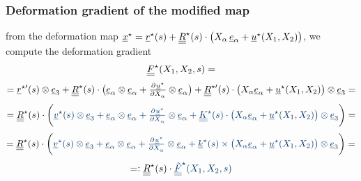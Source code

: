 \begin{frame}
  \frametitle{Deformation gradient of the modified map}

  from the deformation map $\underline{x}^{\star} = \underline{r}^{\star}(s) + \underline{\underline{R}}^{\star}(s) \cdot \bigl( X_{\alpha} \, \underline{e}_{\alpha} + \underline{u}^{\star}(X_1,X_2) \bigr)$, \newline
  we compute the deformation gradient
  \vspace{0.3em}
  \begin{displaymath}
    \underline{\underline{F}}^{\star}(X_1,X_2,s) =
  \end{displaymath}
  \begin{displaymath}
    = \underline{r}^{\star \prime}(s) \otimes \underline{e}_3 +
      \doubleunderline{R}^{\star}(s) \cdot \bigl( \underline{e}_{\alpha} \otimes \underline{e}_{\alpha} +
      \pd{\underline{u}^{\star}}{X_{\alpha}} \otimes \underline{e}_{\alpha} \bigr) +
      \doubleunderline{R}^{\star \prime}(s) \cdot \bigl( X_{\alpha} \underline{e}_{\alpha} + \underline{u}^{\star}(X_1,X_2) \bigr) \otimes \underline{e}_3 =
  \end{displaymath}
  \begin{displaymath}
    = \doubleunderline{R}^{\star}(s) \cdot \biggl( {\color{faublue}
        \underline{v}^{\star}(s) \otimes \underline{e}_3 +
        \underline{e}_{\alpha} \otimes \underline{e}_{\alpha} + 
        \pd{\underline{u}^{\star}}{X_{\alpha}} \otimes \underline{e}_{\alpha} +
        \doubleunderline{K}^{\star}(s) \cdot \bigl( X_{\alpha} \underline{e}_{\alpha} + \underline{u}^{\star}(X_1,X_2) \bigr) \otimes \underline{e}_3 }
      \biggr) =
  \end{displaymath}
  \begin{displaymath}
    = \doubleunderline{R}^{\star}(s) \cdot \biggl( {\color{faublue}
        \underline{v}^{\star}(s) \otimes \underline{e}_3 + 
        \underline{e}_{\alpha} \otimes \underline{e}_{\alpha} + 
        \pd{\underline{u}^{\star}}{X_{\alpha}} \otimes \underline{e}_{\alpha} +
        \underline{k}^{\star}(s) \times \bigl( X_{\alpha} \underline{e}_{\alpha} + \underline{u}^{\star}(X_1,X_2) \bigr) \otimes \underline{e}_3 }
      \biggr) =
  \end{displaymath}
  \begin{displaymath}
    =: \doubleunderline{R}^{\star}(s) \cdot {\color{faublue} \doubleunderline{\tilde{F}}^{\star} (X_1,X_2,s) }
  \end{displaymath}
\end{frame}



